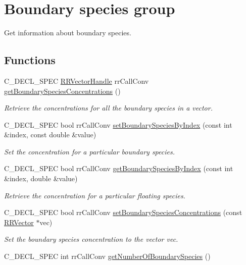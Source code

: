 \hypertarget{group__boundary}{
\section{\-Boundary species group}
\label{group__boundary}
}


\-Get information about boundary species.  


\subsection*{\-Functions}
\begin{DoxyCompactItemize}
\item 
\-C\-\_\-\-D\-E\-C\-L\-\_\-\-S\-P\-E\-C \hyperlink{rr__c__types_8h_aea46a16752b0ae2cd95c009030ee630e}{\-R\-R\-Vector\-Handle} \*
rr\-Call\-Conv \hyperlink{group__boundary_gaae9b6b75211923bcf6f7196fe707c631}{get\-Boundary\-Species\-Concentrations} ()
\begin{DoxyCompactList}\small\item\em \-Retrieve the concentrations for all the boundary species in a vector. \end{DoxyCompactList}\item 
\-C\-\_\-\-D\-E\-C\-L\-\_\-\-S\-P\-E\-C bool rr\-Call\-Conv \hyperlink{group__boundary_gabb6764fa48d0b3f2ca3b38e391479347}{set\-Boundary\-Species\-By\-Index} (const int \&index, const double \&value)
\begin{DoxyCompactList}\small\item\em \-Set the concentration for a particular boundary species. \end{DoxyCompactList}\item 
\-C\-\_\-\-D\-E\-C\-L\-\_\-\-S\-P\-E\-C bool rr\-Call\-Conv \hyperlink{group__boundary_gaad04359bcaa998547d71b4cdd337796e}{get\-Boundary\-Species\-By\-Index} (const int \&index, double \&value)
\begin{DoxyCompactList}\small\item\em \-Retrieve the concentration for a particular floating species. \end{DoxyCompactList}\item 
\-C\-\_\-\-D\-E\-C\-L\-\_\-\-S\-P\-E\-C bool rr\-Call\-Conv \hyperlink{group__boundary_ga161f8d9a48e36631d34d07c252bcc444}{set\-Boundary\-Species\-Concentrations} (const \hyperlink{struct_r_r_vector}{\-R\-R\-Vector} $\ast$vec)
\begin{DoxyCompactList}\small\item\em \-Set the boundary species concentration to the vector vec. \end{DoxyCompactList}\item 
\hypertarget{group__boundary_ga17c851dfb27b9697ff286cc57d4cd10d}{
\-C\-\_\-\-D\-E\-C\-L\-\_\-\-S\-P\-E\-C int rr\-Call\-Conv \hyperlink{group__boundary_ga17c851dfb27b9697ff286cc57d4cd10d}{get\-Number\-Of\-Boundary\-Species} ()}
\label{group__boundary_ga17c851dfb27b9697ff286cc57d4cd10d}


\end{DoxyCompactItemize}
